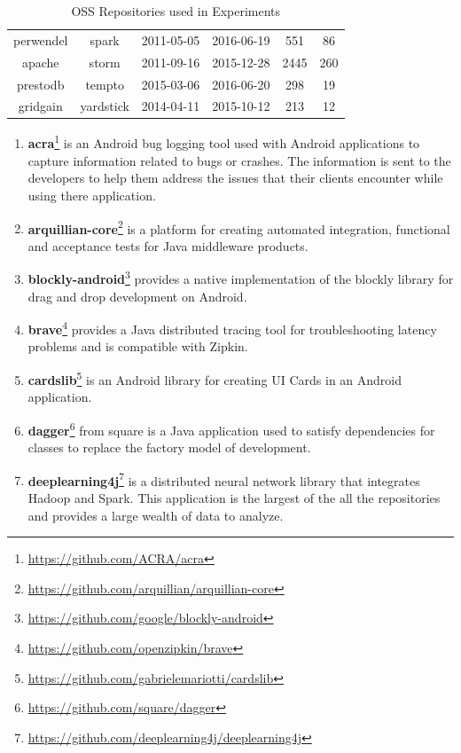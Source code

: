 \begin{table}[!hbp]
\begin{center}
\begin{tabular}{|c|c|c|c|c|c|}
        perwendel & spark & 2011-05-05 & 2016-06-19 & 551 & 86 \\
        apache & storm & 2011-09-16 & 2015-12-28 & 2445 & 260 \\
        prestodb & tempto & 2015-03-06 & 2016-06-20 & 298 & 19 \\
        gridgain & yardstick & 2014-04-11 & 2015-10-12 & 213 & 12 \\
        \hline
    \end{tabular}
\end{center}
\caption{OSS Repositories used in Experiments}
\label{tab:repositories_summary}
\end{table}

\begin{enumerate}
\item \textbf{acra}\footnote{\url{https://github.com/ACRA/acra}} is an Android bug logging tool used with Android applications to capture information related to bugs or crashes. The information is sent to the developers to help them address the issues that their clients encounter while using there application.
\item \textbf{arquillian-core}\footnote{\url{https://github.com/arquillian/arquillian-core}} is a platform for creating automated integration, functional and acceptance tests for Java middleware products. 
\item \textbf{blockly-android}\footnote{\url{https://github.com/google/blockly-android}} provides a native implementation of the blockly library for drag and drop development on Android. 
\item \textbf{brave}\footnote{\url{https://github.com/openzipkin/brave}} provides a Java distributed tracing tool for troubleshooting latency problems and is compatible with Zipkin.
\item \textbf{cardslib}\footnote{\url{https://github.com/gabrielemariotti/cardslib}} is an Android library for creating UI Cards in an Android application.
\item \textbf{dagger}\footnote{\url{https://github.com/square/dagger}} from square is a Java application used to satisfy dependencies for classes to replace the factory model of development.
\item \textbf{deeplearning4j}\footnote{\url{https://github.com/deeplearning4j/deeplearning4j}} is a distributed neural network library that integrates Hadoop and Spark. This application is the largest of the all the repositories and provides a large wealth of data to analyze.

\end{enumerate}
